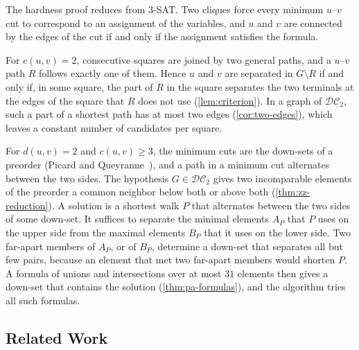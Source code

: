 \documentclass[pdflatex,sn-mathphys-num]{sn-jnl}%
\theoremstyle{thmstyleone}%
\theoremstyle{thmstyletwo}%
\theoremstyle{thmstylethree}%
\newcommand{\DC}{\mathcal{DC}_2}%
\begin{document}
The hardness proof reduces from 3-SAT.
Two cliques force every minimum $u$--$v$ cut to correspond to an assignment of the variables, and $u$ and $v$ are connected by the edges of the cut if and only if the assignment satisfies the formula.

For $c(u, v) = 2$, consecutive squares are joined by two general paths, and a $u$--$v$ path $R$ follows exactly one of them.
Hence $u$ and $v$ are separated in $G \setminus R$ if and only if, in some square, the part of $R$ in the square separates the two terminals at the edges of the square that $R$ does not use (\cref{lem:criterion}).
In a graph of $\DC$, such a part of a shortest path has at most two edges (\cref{cor:two-edges}), which leaves a constant number of candidates per square.

For $d(u, v) = 2$ and $c(u, v) \geq 3$, the minimum cuts are the down-sets of a preorder (Picard and Queyranne~\cite{PicardQueyranne1980}), and a path in a minimum cut alternates between the two sides.
The hypothesis $G \in \DC$ gives two incomparable elements of the preorder a common neighbor below both or above both (\cref{thm:zz-reduction}).
A solution is a shortest walk $P$ that alternates between the two sides of some down-set.
It suffices to separate the minimal elements $A_P$ that $P$ uses on the upper side from the maximal elements $B_P$ that it uses on the lower side.
Two far-apart members of $A_P$, or of $B_P$, determine a down-set that separates all but few pairs, because an element that met two far-apart members would shorten $P$.
A formula of unions and intersections over at most $31$ elements then gives a down-set that contains the solution (\cref{thm:pa-formulas}), and the algorithm tries all such formulas.

\subsection{Related Work}\label{sec:related-work}
\end{document}

